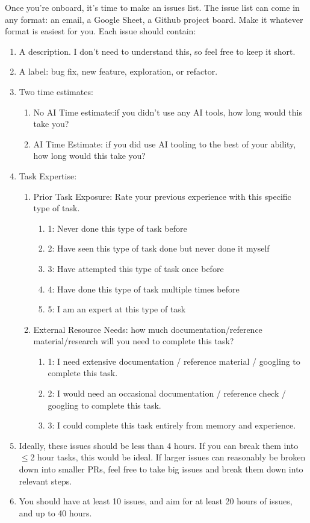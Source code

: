 \documentclass{article}
\begin{document}
\begin{instructionbox}
Once you’re onboard, it’s time to make an issues list. 
The issue list can come in any format: an email, a Google Sheet, a Github project board. Make it whatever format is easiest for you.
Each issue should contain:
\begin{enumerate}
    \item A description. I don’t need to understand this, so feel free to keep it short.
    \item A label: bug fix, new feature, exploration, or refactor.
    \item Two time estimates:
    \begin{enumerate}
        \item No AI Time estimate:if you didn’t use any AI tools, how long would this take you?
        \item AI Time Estimate:  if you did use AI tooling to the best of your ability, how long would this take you?
    \end{enumerate}
    \item Task Expertise: 
    \begin{enumerate}
        \item Prior Task Exposure: Rate your previous experience with this specific type of task.
        \begin{enumerate}
            \item 1: Never done this type of task before
            \item 2: Have seen this type of task done but never done it myself
            \item 3: Have attempted this type of task once before
            \item 4: Have done this type of task multiple times before
            \item 5: I am an expert at this type of task
        \end{enumerate}
        \item External Resource Needs: how much documentation/reference material/research will you need to complete this task?
        \begin{enumerate}
            \item 1: I need extensive documentation / reference material / googling to complete this task.
            \item 2: I would need an occasional documentation / reference check / googling to complete this task.
            \item 3: I could complete this task entirely from memory and experience.
        \end{enumerate}
    \end{enumerate}
    \item Ideally, these issues should be less than 4 hours. If you can break them into $\leq$2 hour tasks, this would be ideal. If larger issues can reasonably be broken down into smaller PRs, feel free to take big issues and break them down into relevant steps.
    \item You should have at least 10 issues, and aim for at least 20 hours of issues, and up to 40 hours. 
\end{enumerate}


\end{instructionbox}
\end{document}
